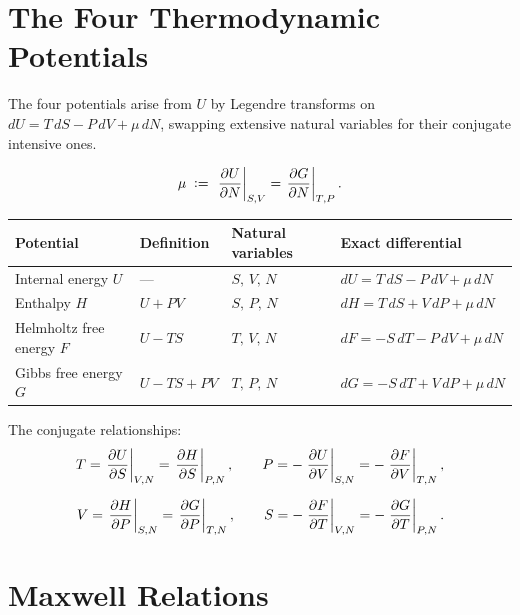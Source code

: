 \section{The Four Thermodynamic Potentials}

The four potentials arise from $U$ by Legendre transforms on $dU = T\,dS - P\,dV + \mu\,dN$, swapping extensive natural variables for their conjugate intensive ones.

\begin{definition}
\begin{equation}
    \mu \;\vcentcolon=\; \left.\pdv{U}{N}\right|_{S,V} = \left.\pdv{G}{N}\right|_{T,P}.
\end{equation}
\end{definition}

\begin{center}
\begin{tabular}{llll}
    \hline
    Potential & Definition & Natural variables & Exact differential \\
    \hline
    Internal energy $U$ & --- & $S,\,V,\,N$ & $dU = T\,dS - P\,dV + \mu\,dN$ \\[4pt]
    Enthalpy $H$ & $U + PV$ & $S,\,P,\,N$ & $dH = T\,dS + V\,dP + \mu\,dN$ \\[4pt]
    Helmholtz free energy $F$ & $U - TS$ & $T,\,V,\,N$ & $dF = -S\,dT - P\,dV + \mu\,dN$ \\[4pt]
    Gibbs free energy $G$ & $U - TS + PV$ & $T,\,P,\,N$ & $dG = -S\,dT + V\,dP + \mu\,dN$ \\
    \hline
\end{tabular}
\end{center}

The conjugate relationships:
\begin{align}
    T = \left.\pdv{U}{S}\right|_{V,N} = \left.\pdv{H}{S}\right|_{P,N}, \qquad
    P = -\left.\pdv{U}{V}\right|_{S,N} = -\left.\pdv{F}{V}\right|_{T,N}, \\[6pt]
    V = \left.\pdv{H}{P}\right|_{S,N} = \left.\pdv{G}{P}\right|_{T,N}, \qquad
    S = -\left.\pdv{F}{T}\right|_{V,N} = -\left.\pdv{G}{T}\right|_{P,N}.
\end{align}

\section{Maxwell Relations}

